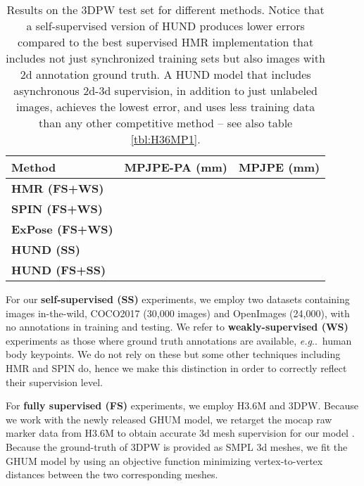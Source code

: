 \documentclass[final]{cvpr}
\makeatletter
\DeclareRobustCommand\onedot{\futurelet\@let@token\@onedot}
\def\@onedot{\ifx\@let@token.\else.\null\fi\xspace}
\def\eg{\emph{e.g}\onedot} \def\Eg{\emph{E.g}\onedot}
\makeatother
\begin{document}
\begin{table}[!htbp]
    \small
    \centering
    \begin{tabular}[t]{|l||r|r|}
    \hline
    \textbf{Method}  & {MPJPE-PA (mm)} & {MPJPE (mm)} \\ 
    \hline
    \hline
    \textbf{HMR (FS+WS) \cite{Kanazawa2018}} &  &  \\
    \hline
    \textbf{SPIN (FS+WS)\cite{kolotouros2019learning}} &  &  \\
\hline
    \textbf{ExPose (FS+WS)\cite{ExPose:2020}} &  &  \\
    \hline
    \hline
    \textbf{HUND (SS)} &  &  \\
    \hline
    \textbf{HUND (FS+SS)} &  & \\
    \hline
    \end{tabular}
    
    \caption{\small Results on the 3DPW test set for different methods. Notice that a self-supervised version of HUND produces lower errors compared to the best supervised HMR implementation that includes not just synchronized  training sets but also images with 2d annotation ground truth. A HUND model that includes asynchronous 2d-3d supervision, in addition to just unlabeled images, achieves the lowest error, and uses less training data than any other competitive method -- see also table \ref{tbl:H36MP1}.}
\label{tbl:3DPW}
\end{table}

For our \textbf{self-supervised (SS)} experiments, we employ two datasets containing images in-the-wild, COCO2017 \cite{lin2014microsoft} (30,000 images) and OpenImages \cite{OpenImages} (24,000), with no annotations in training and testing. We refer to \textbf{weakly-supervised (WS)} experiments as those where ground truth annotations are available, \eg\ human body keypoints. We do not rely on these but some other techniques including HMR and SPIN do, hence we make this distinction in order to correctly reflect their supervision level.


For \textbf{fully supervised (FS)} experiments, we employ H3.6M and 3DPW. Because we work with the newly released GHUM model, we retarget the mocap raw marker data from H3.6M to obtain accurate 3d mesh supervision for our model \cite{ghum2020}. Because the ground-truth of 3DPW is provided as SMPL 3d meshes, we fit the GHUM model by using an objective function minimizing vertex-to-vertex distances between the two corresponding meshes. 
\end{document}
